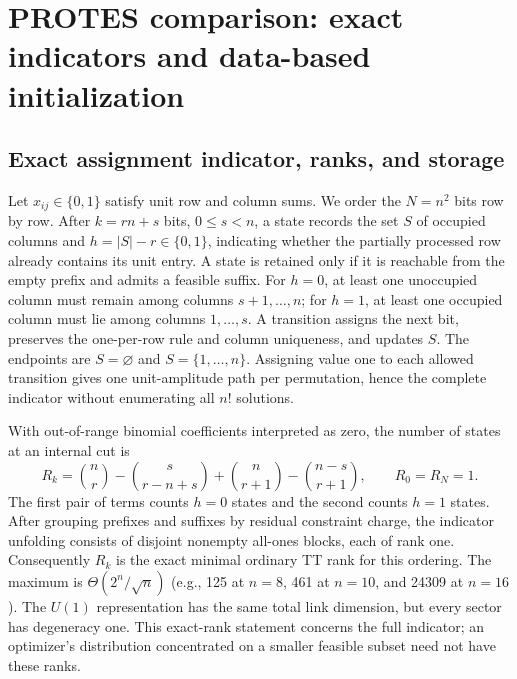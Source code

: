 \clearpage
\section{PROTES comparison: exact indicators and data-based initialization}
\label{app:protes_protocol}

\subsection{Exact assignment indicator, ranks, and storage}
Let $x_{ij}\in\{0,1\}$ satisfy unit row and column sums. We order the $N=n^2$
bits row by row. After $k=rn+s$ bits, $0\le s<n$, a state records the set
$S$ of occupied columns and $h=|S|-r\in\{0,1\}$, indicating whether the
partially processed row already contains its unit entry. A state is retained
only if it is reachable from the empty prefix and admits a feasible suffix.
For $h=0$, at least one unoccupied column must remain among columns
$s+1,\ldots,n$; for $h=1$, at least one occupied column must lie among
columns $1,\ldots,s$. A transition assigns the next bit, preserves the
one-per-row rule and column uniqueness, and updates $S$. The endpoints are
$S=\varnothing$ and $S=\{1,\ldots,n\}$. Assigning value one to each allowed
transition gives one unit-amplitude path per permutation, hence the complete
indicator without enumerating all $n!$ solutions.

With out-of-range binomial coefficients interpreted as zero, the number of
states at an internal cut is
\begin{equation}
 R_k=\binom nr-\binom{s}{r-n+s}
       +\binom n{r+1}-\binom{n-s}{r+1},\qquad R_0=R_N=1.
\end{equation}
The first pair of terms counts $h=0$ states and the second counts $h=1$
states. After grouping prefixes and suffixes by residual constraint charge,
the indicator unfolding consists of disjoint nonempty all-ones blocks,
each of rank one. Consequently $R_k$ is the exact minimal ordinary TT rank
for this ordering. The maximum is $\Theta(2^n/\sqrt n)$ (e.g., 125 at $n=8$,
461 at $n=10$, and 24309 at $n=16$). The $U(1)$ representation has the same
total link dimension, but every sector has degeneracy one. This exact-rank
statement concerns the full indicator; an optimizer's distribution concentrated
on a smaller feasible subset need not have these ranks.

